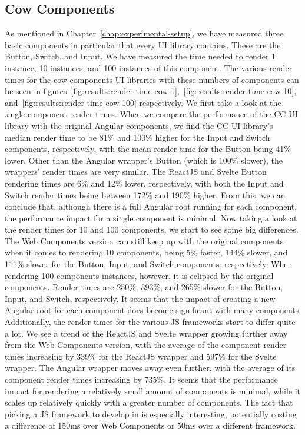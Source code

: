 \subsection{Cow Components}
As mentioned in Chapter~\ref{chap:experimental-setup}, we have measured three basic components in particular that every UI library contains. These are the Button, Switch, and Input. We have measured the time needed to render 1 instance, 10 instances, and 100 instances of this component. The various render times for the cow-components UI libraries with these numbers of components can be seen in figures~\ref{fig:results:render-time-cow-1},~\ref{fig:results:render-time-cow-10}, and~\ref{fig:results:render-time-cow-100} respectively. We first take a look at the single-component render times. When we compare the performance of the CC UI library with the original Angular components, we find the CC UI library's median render time to be 81\% and 100\% higher for the Input and Switch components, respectively, with the mean render time for the Button being 41\% lower. Other than the Angular wrapper's Button (which is 100\% slower), the wrappers' render times are very similar. The ReactJS and Svelte Button rendering times are 6\% and 12\% lower, respectively, with both the Input and Switch render times being between 172\% and 190\% higher. From this, we can conclude that, although there is a full Angular root running for each component, the performance impact for a single component is minimal. Now taking a look at the render times for 10 and 100 components, we start to see some big differences. The Web Components version can still keep up with the original components when it comes to rendering 10 components, being 5\% faster, 144\% slower, and 111\% slower for the Button, Input, and Switch components, respectively. When rendering 100 components instances, however, it is eclipsed by the original components. Render times are 250\%, 393\%, and 265\% slower for the Button, Input, and Switch, respectively. It seems that the impact of creating a new Angular root for each component does become significant with many components.
Additionally, the render times for the various JS frameworks start to differ quite a lot. We see a trend of the ReactJS and Svelte wrapper growing further away from the Web Components version, with the average of the component render times increasing by 339\% for the ReactJS wrapper and 597\% for the Svelte wrapper. The Angular wrapper moves away even further, with the average of its component render times increasing by 735\%. It seems that the performance impact for rendering a relatively small amount of components is minimal, while it scales up relatively quickly with a greater number of components. The fact that picking a JS framework to develop in is especially interesting, potentially costing a difference of 150ms over Web Components or 50ms over a different framework.

